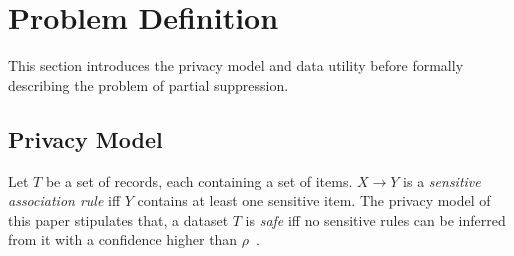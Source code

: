 \section{Problem Definition}
\label{sec:prob}

This section %
introduces the privacy model and data utility before formally describing
the problem of partial suppression.


\subsection{Privacy Model}
Let $T$ be a set of records, each containing a set of items. 
$X \rightarrow Y$ is 
a {\em sensitive association rule} iff $Y$ contains at least one sensitive 
item. The privacy model of this paper
stipulates that, a dataset $T$ is {\em safe} iff no sensitive rules 
can be inferred from it with a confidence higher than 
$\rho$~\cite{Cao:2010:rho}. 

